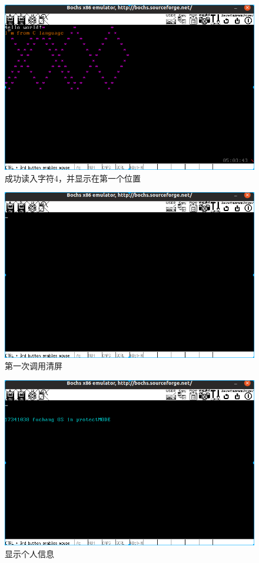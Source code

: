 \documentclass[a4paper,11pt,UTF8]{ctexart}
\newcommand{\bottomcaption}{%
\setlength{\abovecaptionskip}{6pt}%
\setlength{\belowcaptionskip}{6pt}%
\caption}
\begin{document}
	\begin{figure}[htbp]
		\centering
		\includegraphics[width=15cm]{img/4.png}
		\bottomcaption{成功读入字符4，并显示在第一个位置}
	\end{figure}
	\begin{figure}[htbp]
		\centering
		\includegraphics[width=15cm]{img/5.png}
		\bottomcaption{第一次调用清屏}
	\end{figure}
	\begin{figure}[htbp]
		\centering
		\includegraphics[width=15cm]{img/6.png}
		\bottomcaption{显示个人信息}
	\end{figure}
\end{document}
